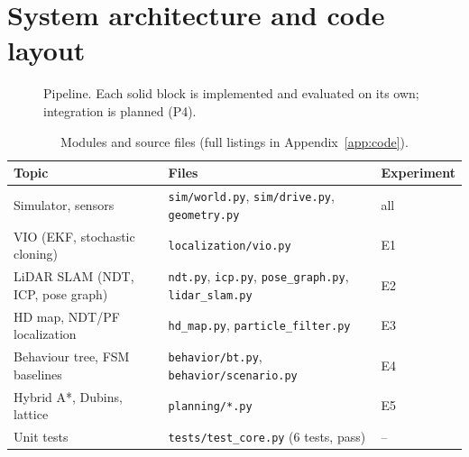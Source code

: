 \documentclass[11pt,a4paper]{article}
\begin{document}
\section{System architecture and code layout}
\begin{figure}[H]\centering
{}
\caption{Pipeline. Each solid block is implemented and evaluated on its own; integration is planned (P4).}
\end{figure}

\begin{table}[H]\centering\small
\caption{Modules and source files (full listings in Appendix~\ref{app:code}).}
\begin{tabular}{lp{7.0cm}l}\toprule
Topic & Files & Experiment\\\midrule
Simulator, sensors & \texttt{sim/world.py}, \texttt{sim/drive.py}, \texttt{geometry.py} & all\\
VIO (EKF, stochastic cloning) & \texttt{localization/vio.py} & E1\\
LiDAR SLAM (NDT, ICP, pose graph) & \texttt{ndt.py}, \texttt{icp.py}, \texttt{pose\_graph.py}, \texttt{lidar\_slam.py} & E2\\
HD map, NDT/PF localization & \texttt{hd\_map.py}, \texttt{particle\_filter.py} & E3\\
Behaviour tree, FSM baselines & \texttt{behavior/bt.py}, \texttt{behavior/scenario.py} & E4\\
Hybrid A*, Dubins, lattice & \texttt{planning/*.py} & E5\\
Unit tests & \texttt{tests/test\_core.py} (6 tests, pass) & --\\\bottomrule
\end{tabular}\end{table}
\end{document}
